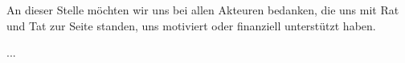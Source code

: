 \noindent An dieser Stelle möchten wir uns bei allen Akteuren bedanken, die uns mit Rat und Tat zur Seite standen, uns motiviert oder finanziell unterstützt haben.

...